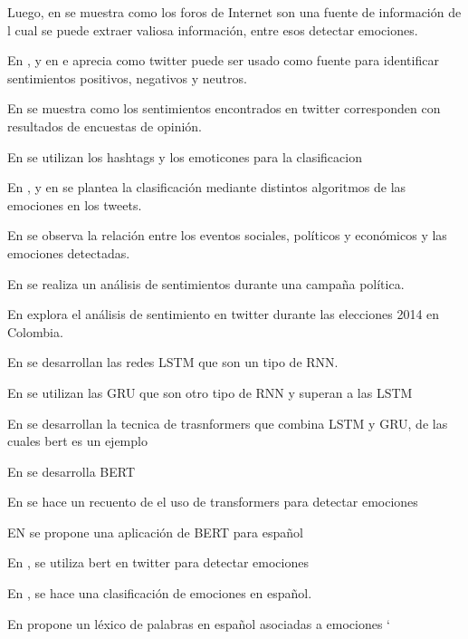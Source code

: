 Luego, en \cite{pang2008opinion} se muestra como los foros de Internet son una fuente de información de l cual se puede extraer valiosa información, entre esos detectar emociones.


En \cite{pak2010twitter}, \cite{kouloumpis2011twitter} y en \cite{go2009twitter}e aprecia como twitter puede ser usado como fuente para identificar sentimientos positivos, negativos y neutros.

En \cite{o2010tweets} se muestra como los sentimientos encontrados en twitter corresponden con resultados de encuestas de opinión.

En \cite{davidov2010enhanced} se utilizan los hashtags y los emoticones para la clasificacion


En  , \cite{wang2012harnessing}y en \cite{roberts2012empatweet} se plantea la clasificación mediante distintos algoritmos de las emociones en los tweets.



En \cite{bollen2011modeling} se observa la relación entre los eventos sociales, políticos y económicos y las emociones detectadas.

En \cite{tumasjan2010predicting} se realiza un análisis de sentimientos durante una campaña política.

En \cite{ceron2016sentiment} explora el análisis de sentimiento en twitter durante las elecciones 2014 en Colombia.

En \cite{hochreiter1997long} se desarrollan las redes LSTM que son un tipo de RNN.

En \cite{chung2014empirical} se utilizan las GRU que son otro tipo de RNN y superan a las LSTM

En \cite{vaswani2017attention} se desarrollan la tecnica de trasnformers que combina LSTM y GRU, de las cuales bert es un ejemplo

En \cite{devlin2018bert} se desarrolla BERT

En \cite{acheampong2021transformer} se hace un recuento de el uso de transformers para detectar emociones

EN \cite{canete2020spanish} se propone una aplicación de BERT para español

En \cite{gonzalez2021twilbert}, \cite{huang2019ana} se utiliza bert en twitter para  detectar emociones

En \cite{plaza2020improved}, \cite{gil2013combining} se hace una clasificación de emociones en español.


En \cite{sidorov2012empirical} propone un léxico de palabras en español asociadas a emociones
`








